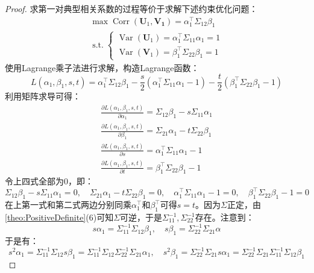\begin{proof}
	求第一对典型相关系数的过程等价于求解下述约束优化问题：
	\begin{gather*}
		\max\operatorname{Corr}(\mathbf{U}_1,\mathbf{V_1})=\alpha_1^{\top}\Sigma_{12}\beta_1 \\
		\operatorname{s.t.}
		\begin{cases}
			\operatorname{Var}(\mathbf{U}_1)=\alpha_1^{\top}\Sigma_{11}\alpha_1=1 \\
			\operatorname{Var}(\mathbf{V}_1)=\beta_1^{\top}\Sigma_{22}\beta_1=1
		\end{cases}
	\end{gather*}
	使用Lagrange乘子法进行求解，构造Lagrange函数：
	\begin{equation*}
		L(\alpha_1,\beta_1,s,t)=\alpha_1^{\top}\Sigma_{12}\beta_1-\frac{s}{2}(\alpha_1^{\top}\Sigma_{11}\alpha_1-1)-\frac{t}{2}(\beta_1^{\top}\Sigma_{22}\beta_1-1)
	\end{equation*}
	利用矩阵求导可得：
	\begin{gather*}
		\frac{\partial L(\alpha_1,\beta_1,s,t)}{\partial\alpha_1}=\Sigma_{12}\beta_1-s\Sigma_{11}\alpha_1 \\
		\frac{\partial L(\alpha_1,\beta_1,s,t)}{\partial\beta_1}=\Sigma_{21}\alpha_1-t\Sigma_{22}\beta_1 \\
		\frac{\partial L(\alpha_1,\beta_1,s,t)}{\partial s}=\alpha_1^{\top}\Sigma_{11}\alpha_1-1 \\
		\frac{\partial L(\alpha_1,\beta_1,s,t)}{\partial t}=\beta_1^{\top}\Sigma_{22}\beta_1-1
	\end{gather*}
	令上四式全部为$0$，即：
	\begin{equation*}
		\Sigma_{12}\beta_1-s\Sigma_{11}\alpha_1=0,\quad\Sigma_{21}\alpha_1-t\Sigma_{22}\beta_1=0,\quad\alpha_1^{\top}\Sigma_{11}\alpha_1-1=0,\quad\beta_1^{\top}\Sigma_{22}\beta_1-1=0
	\end{equation*}
	在上第一式和第二式两边分别同乘$\alpha_1^{\top}$和$\beta_1^{\top}$可得$s=t$。因为$\Sigma$正定，由\cref{theo:PositiveDefinite}(6)可知$\Sigma$可逆，于是$\Sigma_{11}^{-1},\Sigma_{22}^{-1}$存在。注意到：
	\begin{equation*}
		s\alpha_1=\Sigma_{11}^{-1}\Sigma_{12}\beta_1,\quad s\beta_1=\Sigma_{22}^{-1}\Sigma_{21}\alpha
	\end{equation*}
	于是有：
	\begin{equation*}
		s^2\alpha_1=\Sigma_{11}^{-1}\Sigma_{12}s\beta_1=\Sigma_{11}^{-1}\Sigma_{12}\Sigma_{22}^{-1}\Sigma_{21}\alpha_1,\quad
		s^2\beta_1=\Sigma_{22}^{-1}\Sigma_{21}s\alpha_1=\Sigma_{22}^{-1}\Sigma_{21}\Sigma_{11}^{-1}\Sigma_{12}\beta_1

\end{equation*}
\end{proof}
